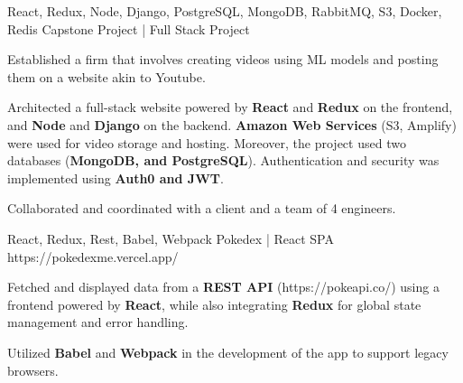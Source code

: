 


\begin{cventries}



\cventry
{React, Redux, Node, Django, PostgreSQL, MongoDB, RabbitMQ, S3, Docker, Redis } %
{Capstone Project | Full Stack Project}  %
{} %
{}
{
	\begin{cvitems} %
		\item {Established a firm that involves creating videos using ML models and posting them on a website akin to Youtube.}
		\item {Architected a full-stack website powered by \textbf{React} and \textbf{Redux} on the frontend, and \textbf{Node} and \textbf{Django} on the backend. \textbf{Amazon Web Services} (S3, Amplify) were used for video storage and hosting. Moreover, the project used two databases (\textbf{MongoDB, and PostgreSQL}). Authentication and security was implemented using \textbf{Auth0 and JWT}.}
		\item {Collaborated and coordinated with a client and a team of 4 engineers.}
	\end{cvitems}
}

\cventry
{React, Redux, Rest, Babel, Webpack} %
{Pokedex | React SPA}  %
{https://pokedexme.vercel.app/} %
{}
{
	\begin{cvitems} %
		\item {Fetched and displayed data from a \textbf{REST API} (https://pokeapi.co/) using a frontend powered by \textbf{React}, while also integrating \textbf{Redux}  for global state management and error handling.}
		\item {Utilized \textbf{Babel} and \textbf{Webpack}  in the development of the app to support legacy browsers.}
	\end{cvitems}
}


\end{cventries}
